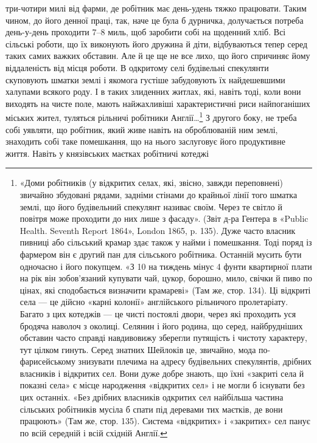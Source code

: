 три-чотири милі від фарми, де робітник має день-удень
тяжко працювати. Таким чином, до його денної праці, так, наче
це була б дурничка, долучається потреба день-у-день проходити
7--8 миль, щоб заробити собі на щоденний хліб. Всі сільські
роботи, що їх виконують його дружина й діти, відбуваються
тепер серед таких самих важких обставин. Але й це ще не все
лихо, що його спричиняє йому віддаленість від місця роботи.
В одкритому селі будівельні спекулянти скуповують шматки землі
і якомога густіше забудовують їх найдешевшими халупами
всякого роду. І в таких злиденних житлах, які, навіть тоді,
коли вони виходять на чисте поле, мають найжахливіші характеристичні
риси найпоганіших міських жител, туляться рільничі
робітники Англії\dots{}\footnote{
«Доми робітників (у відкритих селах, які, звісно, завжди переповнені)
звичайно збудовані рядами, задніми стінами до крайньої лінії
того шматка землі, що його будівельний спекулянт називає своїм. Через
те світло й повітря може проходити до них лише з фасаду». (Звіт д-ра
Гентера в «Public Health. Seventh Report 1864», London 1865, p. 135).
Дуже часто власник пивниці або сільський крамар здає також у найми
і помешкання. Тоді поряд із фармером він є другий пан для сільського
робітника. Останній мусить бути одночасно і його покупцем. «З 10
на тиждень мінус 4 фунти квартирної плати на рік він зобов’язаний
купувати чай, цукор, борошно, мило, свічки й пиво по цінах,
які сподобається визначити крамареві» (Там же, стор. 134). Ці відкриті
села — це дійсно «карні колонії» англійського рільничого пролетаріату.
Багато з цих котеджів — це чисті постоялі двори, через які проходить
уся бродяча наволоч з околиці. Селянин і його родина, що серед,
найбрудніших обставин часто справді навдивовижу зберегли путящість
і чистоту характеру, тут цілком гинуть. Серед знатних Шейлоків це,
звичайно, мода по-фарисейському знизувати плечима на адресу будівельних
спекулянтів, дрібних власників і відкритих сел. Вони дуже
добре знають, що їхні «закриті села й показні села» є місце народження
«відкритих сел» і не могли б існувати без цих останніх. «Без дрібних
власників одкритих сел найбільша частина сільських робітників мусіла б
спати під деревами тих маєтків, де вони працюють» (Там же, стор. 135).
Система «відкритих» і «закритих» сел панує по всій середній і всій
східній Англії.
} З другого боку, не треба собі уявляти,
що робітник, який живе навіть на оброблюваній ним землі, знаходить
собі таке помешкання, що на нього заслуговує його продуктивне
життя. Навіть у князівських маєтках робітничі котеджі
